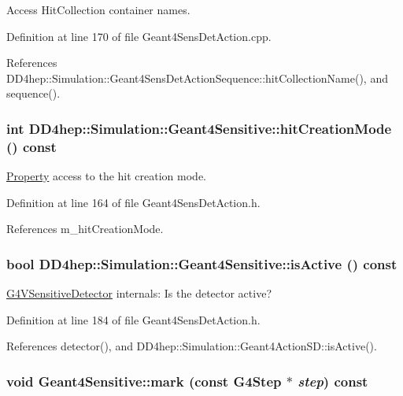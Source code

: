 Access HitCollection container names. 

Definition at line 170 of file Geant4SensDetAction.cpp.

References DD4hep::Simulation::Geant4SensDetActionSequence::hitCollectionName(), and sequence().\hypertarget{class_d_d4hep_1_1_simulation_1_1_geant4_sensitive_a5989fb84f6cf345de35d877f637c5b8d}{
\subsubsection[{hitCreationMode}]{\setlength{\rightskip}{0pt plus 5cm}int DD4hep::Simulation::Geant4Sensitive::hitCreationMode () const}}
\label{class_d_d4hep_1_1_simulation_1_1_geant4_sensitive_a5989fb84f6cf345de35d877f637c5b8d}


\hyperlink{class_d_d4hep_1_1_property}{Property} access to the hit creation mode. 

Definition at line 164 of file Geant4SensDetAction.h.

References m\_\-hitCreationMode.\hypertarget{class_d_d4hep_1_1_simulation_1_1_geant4_sensitive_a4440fac2d42489c6df33f3b8f416f512}{
\subsubsection[{isActive}]{\setlength{\rightskip}{0pt plus 5cm}bool DD4hep::Simulation::Geant4Sensitive::isActive () const}}
\label{class_d_d4hep_1_1_simulation_1_1_geant4_sensitive_a4440fac2d42489c6df33f3b8f416f512}


\hyperlink{class_g4_v_sensitive_detector}{G4VSensitiveDetector} internals: Is the detector active? 

Definition at line 184 of file Geant4SensDetAction.h.

References detector(), and DD4hep::Simulation::Geant4ActionSD::isActive().\hypertarget{class_d_d4hep_1_1_simulation_1_1_geant4_sensitive_ae241043b3ab258a666370d07b4d69f68}{
\subsubsection[{mark}]{\setlength{\rightskip}{0pt plus 5cm}void Geant4Sensitive::mark (const G4Step $\ast$ {\em step}) const}}
\label{class_d_d4hep_1_1_simulation_1_1_geant4_sensitive_ae241043b3ab258a666370d07b4d69f68}


